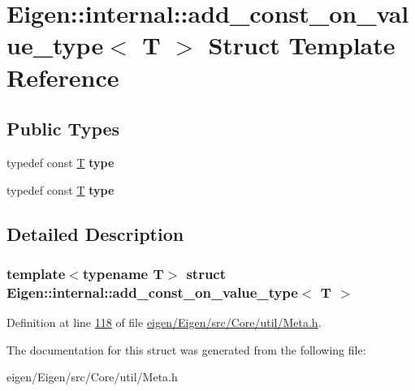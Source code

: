 \hypertarget{struct_eigen_1_1internal_1_1add__const__on__value__type}{}\section{Eigen\+:\+:internal\+:\+:add\+\_\+const\+\_\+on\+\_\+value\+\_\+type$<$ T $>$ Struct Template Reference}
\label{struct_eigen_1_1internal_1_1add__const__on__value__type}
\subsection*{Public Types}
\begin{DoxyCompactItemize}
\item 
\mbox{\label{struct_eigen_1_1internal_1_1add__const__on__value__type_a7e1901ec0dabdc36b5458664d354d35a}} 
typedef const \hyperlink{group___sparse_core___module}{T} {\bfseries type}
\item 
\mbox{\label{struct_eigen_1_1internal_1_1add__const__on__value__type_a7e1901ec0dabdc36b5458664d354d35a}} 
typedef const \hyperlink{group___sparse_core___module}{T} {\bfseries type}
\end{DoxyCompactItemize}


\subsection{Detailed Description}
\subsubsection*{template$<$typename T$>$\newline
struct Eigen\+::internal\+::add\+\_\+const\+\_\+on\+\_\+value\+\_\+type$<$ T $>$}



Definition at line \hyperlink{eigen_2_eigen_2src_2_core_2util_2_meta_8h_source_l00118}{118} of file \hyperlink{eigen_2_eigen_2src_2_core_2util_2_meta_8h_source}{eigen/\+Eigen/src/\+Core/util/\+Meta.\+h}.



The documentation for this struct was generated from the following file\+:\begin{DoxyCompactItemize}
\item 
eigen/\+Eigen/src/\+Core/util/\+Meta.\+h\end{DoxyCompactItemize}
